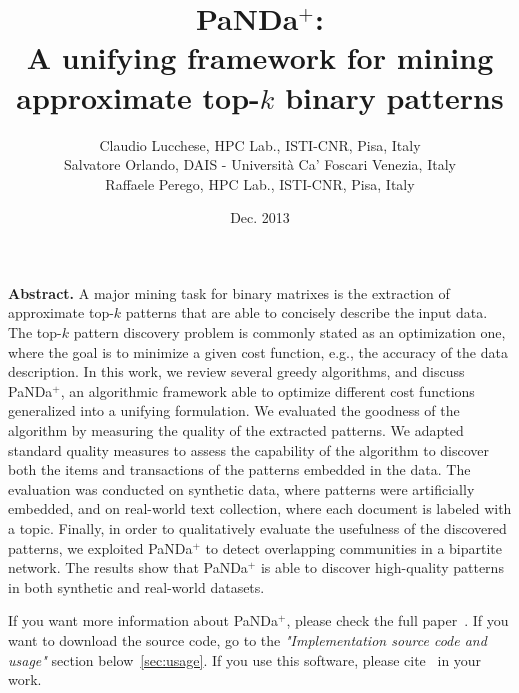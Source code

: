 \documentclass{article}
\newcommand{\myalgostyle}[1]  {{\sc #1}\xspace}
\newcommand{\pandaplus}        {\myalgostyle{PaNDa$^+$}}
\newcommand{\newstuff}[1]{{\color{RoyalBlue} #1}}
\renewcommand\newstuff[1]{#1}
\begin{document}
\title{\pandaplus:\\ A unifying framework for mining approximate top-$k$ binary patterns} %

\author{Claudio Lucchese, HPC Lab., ISTI-CNR, Pisa, Italy \\ 
Salvatore Orlando, DAIS - Universit\`{a} Ca' Foscari Venezia, Italy \\
Raffaele Perego, HPC Lab., ISTI-CNR, Pisa, Italy}
\date{\small Dec. 2013}
\maketitle


{\bf Abstract.}  
A major mining task for binary matrixes is the extraction of  approximate top-$k$ patterns that are able to concisely describe the input data.
The top-$k$ pattern discovery problem is commonly stated as an optimization one, where 
the goal is to minimize a given cost function, e.g., the accuracy of the data description. 
In this work, we review several greedy algorithms,
and  discuss \pandaplus, 
an  algorithmic framework able to optimize different cost functions 
generalized into a unifying formulation.
We evaluated the goodness of the algorithm by measuring the quality of the extracted patterns.
We adapted standard quality measures to assess the capability of the algorithm to discover both the
items and transactions of the patterns embedded in the data.
The evaluation was conducted on synthetic data, where patterns were artificially embedded,
and on real-world text collection, where each document is labeled with a topic.
\newstuff{Finally, in order to qualitatively evaluate the usefulness of the discovered patterns, we 
exploited \pandaplus to detect overlapping communities in a bipartite network.} 
The results show that \pandaplus is able to discover high-quality patterns in both synthetic and real-world datasets.

If you want more information about \pandaplus, please check the full paper~\cite{pandaplus}. If you want to download the source code, go to the 
{\em "Implementation source code and usage"} section below~\ref{sec:usage}. If you use this software, please cite~\cite{pandaplus} in your work.
\end{document}
